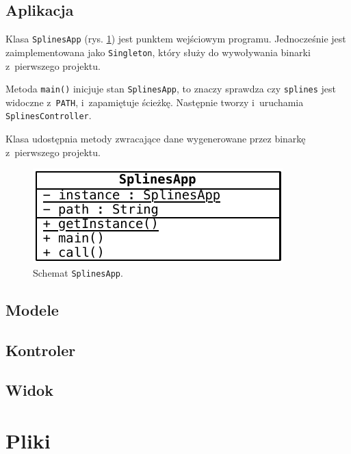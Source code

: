 \documentclass[10pt,a4paper]{article}
\newcommand{\f}[1]{\texttt{#1}}
\begin{document}
\subsection{Aplikacja}

Klasa \f{SplinesApp} (rys. \ref{fig:aplikacja-szczegolowo}) jest punktem
wejściowym programu. Jednocześnie jest zaimplementowana jako \f{Singleton},
który służy do wywoływania binarki z~pierwszego projektu.

Metoda \f{main()} inicjuje stan \f{SplinesApp}, to znaczy sprawdza czy
\f{splines} jest widoczne z~\f{PATH}, i~zapamiętuje ścieżkę. Następnie tworzy
i~uruchamia \f{SplinesController}.

Klasa udostępnia metody zwracające dane wygenerowane przez binarkę z~pierwszego
projektu.

\begin{figure}[hb]
  \centering
  \includegraphics{figury/aplikacja-szczegolowo}
  \caption{Schemat \f{SplinesApp}.}
  \label{fig:aplikacja-szczegolowo}
\end{figure}

\subsection{Modele}

\subsection{Kontroler}

\subsection{Widok}

\section{Pliki}
\end{document}
